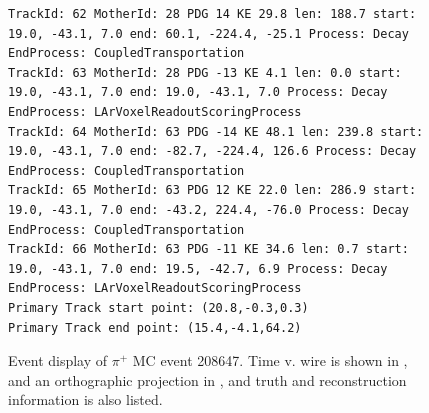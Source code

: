\documentclass[letterpaper,12pt]{article}
\newcommand{\pip}{\ensuremath{\pi^{+}}}
\begin{document}
\begin{figure}[!hbtp]
\begin{center}
\begin{lstlisting}
TrackId: 62 MotherId: 28 PDG 14 KE 29.8 len: 188.7 start: 19.0, -43.1, 7.0 end: 60.1, -224.4, -25.1 Process: Decay EndProcess: CoupledTransportation
TrackId: 63 MotherId: 28 PDG -13 KE 4.1 len: 0.0 start: 19.0, -43.1, 7.0 end: 19.0, -43.1, 7.0 Process: Decay EndProcess: LArVoxelReadoutScoringProcess
TrackId: 64 MotherId: 63 PDG -14 KE 48.1 len: 239.8 start: 19.0, -43.1, 7.0 end: -82.7, -224.4, 126.6 Process: Decay EndProcess: CoupledTransportation
TrackId: 65 MotherId: 63 PDG 12 KE 22.0 len: 286.9 start: 19.0, -43.1, 7.0 end: -43.2, 224.4, -76.0 Process: Decay EndProcess: CoupledTransportation
TrackId: 66 MotherId: 63 PDG -11 KE 34.6 len: 0.7 start: 19.0, -43.1, 7.0 end: 19.5, -42.7, 6.9 Process: Decay EndProcess: LArVoxelReadoutScoringProcess
Primary Track start point: (20.8,-0.3,0.3)
Primary Track end point: (15.4,-4.1,64.2)
\end{lstlisting}
    \caption{%
                Event display of \pip{} MC event 208647. 
                Time v. wire is shown in , 
                and an orthographic projection in ,
                and truth and reconstruction information is also listed.
            }
    \label{fig:evd_pipMC_208647}
  \end{center}
\end{figure}



\end{document}
